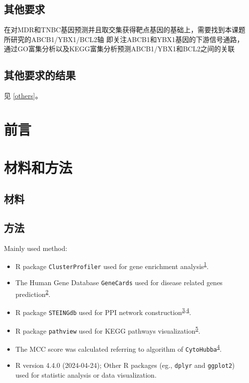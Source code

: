 \documentclass[
]{article}
\providecommand{\tightlist}{%
  \setlength{\itemsep}{0pt}\setlength{\parskip}{0pt}}
\begin{document}
\hypertarget{ux5176ux4ed6ux8981ux6c42}{%
\subsection{其他要求}\label{ux5176ux4ed6ux8981ux6c42}}

在对MDR和TNBC基因预测并且取交集获得靶点基因的基础上，需要找到本课题所研究的ABCB1/YBX1/BCL2轴
即关注ABCB1和YBX1基因的下游信号通路，通过GO富集分析以及KEGG富集分析预测ABCB1/YBX1和BCL2之间的关联

\hypertarget{ux5176ux4ed6ux8981ux6c42ux7684ux7ed3ux679c}{%
\subsection{其他要求的结果}\label{ux5176ux4ed6ux8981ux6c42ux7684ux7ed3ux679c}}

见 \ref{others}。

\hypertarget{introduction}{%
\section{前言}\label{introduction}}

\hypertarget{methods}{%
\section{材料和方法}\label{methods}}

\hypertarget{ux6750ux6599}{%
\subsection{材料}\label{ux6750ux6599}}

\hypertarget{ux65b9ux6cd5}{%
\subsection{方法}\label{ux65b9ux6cd5}}

Mainly used method:

\begin{itemize}
\tightlist
\item
  R package \texttt{ClusterProfiler} used for gene enrichment analysis\textsuperscript{\protect\hyperlink{ref-ClusterprofilerWuTi2021}{1}}.
\item
  The Human Gene Database \texttt{GeneCards} used for disease related genes prediction\textsuperscript{\protect\hyperlink{ref-TheGenecardsSStelze2016}{2}}.
\item
  R package \texttt{STEINGdb} used for PPI network construction\textsuperscript{\protect\hyperlink{ref-TheStringDataSzklar2021}{3},\protect\hyperlink{ref-CytohubbaIdenChin2014}{4}}.
\item
  R package \texttt{pathview} used for KEGG pathways visualization\textsuperscript{\protect\hyperlink{ref-PathviewAnRLuoW2013}{5}}.
\item
  The MCC score was calculated referring to algorithm of \texttt{CytoHubba}\textsuperscript{\protect\hyperlink{ref-CytohubbaIdenChin2014}{4}}.
\item
  R version 4.4.0 (2024-04-24); Other R packages (eg., \texttt{dplyr} and \texttt{ggplot2}) used for statistic analysis or data visualization.
\end{itemize}
\end{document}
